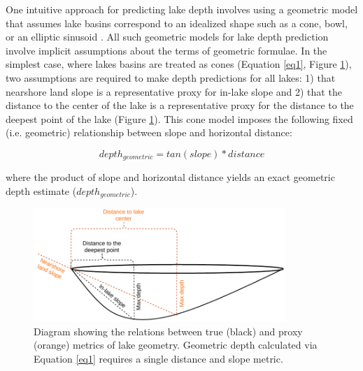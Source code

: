 \documentclass[draft]{agujournal2019}
\begin{document}
One intuitive approach for predicting lake depth involves using a geometric model that assumes lake basins correspond to an idealized shape such as a cone, bowl, or an elliptic sinusoid \cite{hollisterPredictingMaximumLake2011, neumannMaximumDepthAverage1959, yigzawNewGlobalStorage2018}. All such geometric models for lake depth prediction involve implicit assumptions about the terms of geometric formulae. In the simplest case, where lakes basins are treated as cones (Equation \ref{eq1}, Figure \ref{fig1}), two assumptions are required to make depth predictions for all lakes: 1) that nearshore land slope is a representative proxy for in-lake slope and 2) that the distance to the center of the lake is a representative proxy for the distance to the deepest point of the lake (Figure \ref{fig1}). This cone model imposes the following fixed (i.e. geometric) relationship between slope and horizontal distance:

\begin{linenomath*}
\begin{equation}
      depth_{geometric} = tan(slope) * distance \label{eq1}
\end{equation}
\end{linenomath*}

\noindent
where the product of slope and horizontal distance yields an exact geometric depth estimate ($depth_{geometric}$).

\begin{figure}
\noindent\includegraphics[width=0.85\textwidth]{../figures/slope_diagram_new}
\caption{Diagram showing the relations between true (black) and proxy (orange) metrics of lake geometry. Geometric depth calculated via Equation \ref{eq1} requires a single distance and slope metric.}\label{fig1}
\end{figure}
\end{document}
